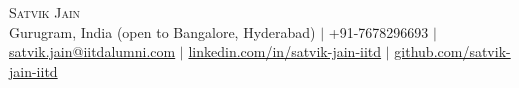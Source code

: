 

\newsavebox{\skbox}
\newcommand{\skillLine}[1]{\item[]\small{\sbox\skbox{#1}\typeout{SKMEAS \the\inputlineno\space\the\wd\skbox\space\the\linewidth}\setlength{\parfillskip}{0pt}#1\endgraf\message{SKLINES \the\inputlineno\space\the\prevgraf}}}
\newcommand{\summaryPara}[1]{{\small\sbox\skbox{#1}\typeout{SUMMEAS \the\inputlineno\space\the\wd\skbox\space\the\linewidth}\setlength{\parfillskip}{0pt}#1\endgraf\message{SUMLINES \the\inputlineno\space\the\prevgraf}}}

\begin{center}
{\Huge \scshape Satvik Jain}\\[3pt]
\small Gurugram, India (open to Bangalore, Hyderabad) $|$ +91-7678296693 $|$ \href{mailto:satvik.jain@iitdalumni.com}{satvik.jain@iitdalumni.com} $|$
\href{https://linkedin.com/in/satvik-jain-iitd}{linkedin.com/in/satvik-jain-iitd} $|$
\href{https://github.com/satvik-jain-iitd}{github.com/satvik-jain-iitd}
\end{center}
